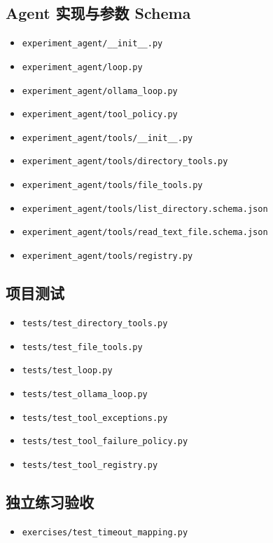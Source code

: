 \subsection{Agent 实现与参数 Schema}
\begin{itemize}
\item \nolinkurl{experiment_agent/__init__.py}
\item \nolinkurl{experiment_agent/loop.py}
\item \nolinkurl{experiment_agent/ollama_loop.py}
\item \nolinkurl{experiment_agent/tool_policy.py}
\item \nolinkurl{experiment_agent/tools/__init__.py}
\item \nolinkurl{experiment_agent/tools/directory_tools.py}
\item \nolinkurl{experiment_agent/tools/file_tools.py}
\item \nolinkurl{experiment_agent/tools/list_directory.schema.json}
\item \nolinkurl{experiment_agent/tools/read_text_file.schema.json}
\item \nolinkurl{experiment_agent/tools/registry.py}
\end{itemize}

\subsection{项目测试}
\begin{itemize}
\item \nolinkurl{tests/test_directory_tools.py}
\item \nolinkurl{tests/test_file_tools.py}
\item \nolinkurl{tests/test_loop.py}
\item \nolinkurl{tests/test_ollama_loop.py}
\item \nolinkurl{tests/test_tool_exceptions.py}
\item \nolinkurl{tests/test_tool_failure_policy.py}
\item \nolinkurl{tests/test_tool_registry.py}
\end{itemize}

\subsection{独立练习验收}
\begin{itemize}
\item \nolinkurl{exercises/test_timeout_mapping.py}
\end{itemize}

